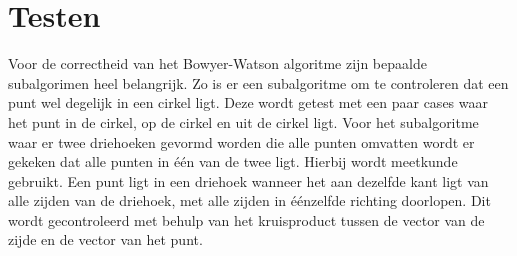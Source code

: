 \section{Testen}
Voor de correctheid van het Bowyer-Watson algoritme zijn bepaalde subalgorimen heel belangrijk. Zo is er een subalgoritme om te controleren dat een punt wel degelijk in een cirkel ligt. Deze wordt getest met een paar cases waar het punt in de cirkel, op de cirkel en uit de cirkel ligt.
Voor het subalgoritme waar er twee driehoeken gevormd worden die alle punten omvatten wordt er gekeken dat alle punten in één van de twee ligt. Hierbij wordt meetkunde gebruikt. Een punt ligt in een driehoek wanneer het aan dezelfde kant ligt van alle zijden van de driehoek, met alle zijden in éénzelfde richting doorlopen. Dit wordt gecontroleerd met behulp van het kruisproduct tussen de vector van de zijde en de vector van het punt. \cite{toepMeetkunde}